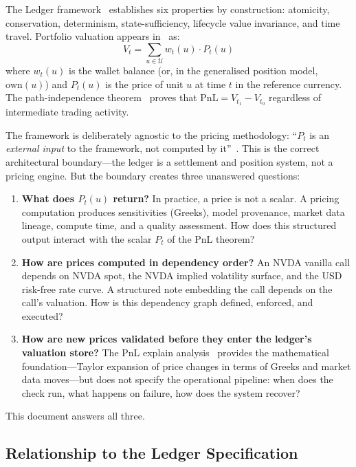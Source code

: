 \documentclass[11pt,a4paper]{article}
\begin{document}
The Ledger framework~\cite{ledger} establishes six properties by construction: atomicity, conservation, determinism, state-sufficiency, lifecycle value invariance, and time travel.  Portfolio valuation appears in~\cite[\S4]{ledger} as:
\[
V_t = \sum_{u \in \mathcal{U}} w_t(u) \cdot P_t(u)
\]
where $w_t(u)$ is the wallet balance (or, in the generalised position model, $\mathrm{own}(u)$) and $P_t(u)$ is the price of unit $u$ at time $t$ in the reference currency.  The path-independence theorem~\cite[\S4.3]{ledger} proves that $\mathrm{PnL} = V_{t_1} - V_{t_0}$ regardless of intermediate trading activity.

The framework is deliberately agnostic to the pricing methodology: ``$P_t$ is an \emph{external input} to the framework, not computed by it''~\cite[\S4.1]{ledger}.  This is the correct architectural boundary---the ledger is a settlement and position system, not a pricing engine.  But the boundary creates three unanswered questions:

\begin{enumerate}
\item \textbf{What does $P_t(u)$ return?}  In practice, a price is not a scalar.  A pricing computation produces sensitivities (Greeks), model provenance, market data lineage, compute time, and a quality assessment.  How does this structured output interact with the scalar $P_t$ of the PnL theorem?

\item \textbf{How are prices computed in dependency order?}  An NVDA vanilla call depends on NVDA spot, the NVDA implied volatility surface, and the USD risk-free rate curve.  A structured note embedding the call depends on the call's valuation.  How is this dependency graph defined, enforced, and executed?

\item \textbf{How are new prices validated before they enter the ledger's valuation store?}  The PnL explain analysis~\cite{pnl_explain} provides the mathematical foundation---Taylor expansion of price changes in terms of Greeks and market data moves---but does not specify the operational pipeline: when does the check run, what happens on failure, how does the system recover?
\end{enumerate}

This document answers all three.

\subsection{Relationship to the Ledger Specification}
\end{document}

